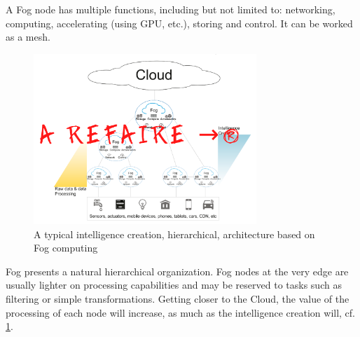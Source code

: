 \documentclass[11pt]{sdm}
\begin{document}
\begin{description}
		A Fog node has multiple functions, including but not limited to: networking, computing, accelerating (using \gls{GPU}, etc.), storing and control. It can be worked as a mesh.

		\begin{figure}[t]
			\centering
			\includegraphics[width=0.75\textwidth]{./assets/FogArchi.png}
			\caption{A typical intelligence creation, hierarchical, architecture based on Fog computing}
			\label{fig:fog_archi}
		\end{figure}

		Fog presents a natural hierarchical organization. Fog nodes at the very edge are usually lighter on processing capabilities and may be reserved to tasks such as filtering or simple transformations. Getting closer to the Cloud, the value of the processing of each node will increase, as much as the intelligence creation will, cf. \cref{fig:fog_archi}.



\end{description}
\end{document}
